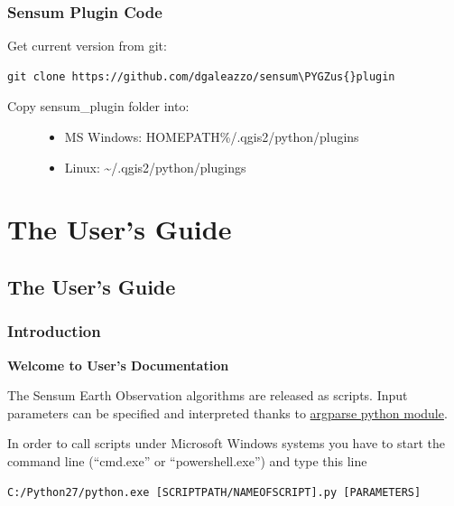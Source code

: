 \documentclass[letterpaper,10pt,english]{sphinxmanual}
\def\PYGZus{\char`\_}
\begin{document}
\subsection{Sensum Plugin Code}
\label{install:sensum-plugin-code}
Get current version from git:

\begin{Verbatim}[frame=single,commandchars=\\\{\}]
git clone https://github.com/dgaleazzo/sensum\PYGZus{}plugin
\end{Verbatim}
\begin{description}
\item[{Copy sensum\_plugin folder into:}] \leavevmode\begin{itemize}
\item {} 
MS Windows: HOMEPATH\%/.qgis2/python/plugins

\item {} 
Linux: \textasciitilde{}/.qgis2/python/plugings

\end{itemize}

\end{description}


\chapter{The User's Guide}
\label{index:the-user-s-guide}

\section{The User's Guide}
\label{user:the-user-s-guide}\label{user::doc}

\subsection{Introduction}
\label{user:introduction}
\textbf{Welcome to User's Documentation}

The Sensum Earth Observation algorithms are released as scripts. Input parameters can be specified and interpreted thanks to  \href{https://docs.python.org/3/library/argparse.html}{argparse python module}.

In order to call scripts under Microsoft Windows systems you have to start the command line (``cmd.exe'' or ``powershell.exe'') and type this line

\begin{Verbatim}[frame=single,commandchars=\\\{\}]
C:/Python27/python.exe [SCRIPTPATH/NAMEOFSCRIPT].py [PARAMETERS]
\end{Verbatim}
\end{document}
